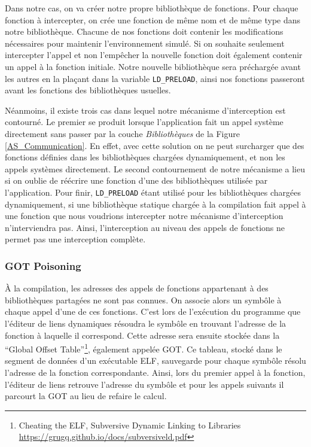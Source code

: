 Dans notre cas, on va créer notre propre bibliothèque de fonctions. Pour chaque
fonction à intercepter, on crée une fonction de même nom et de même type dans
notre bibliothèque. Chacune de nos fonctions doit contenir les modifications
nécessaires pour maintenir l'environnement simulé. Si on souhaite seulement
intercepter l'appel et non l'empêcher la nouvelle fonction doit également
contenir un appel à la fonction initiale. Notre nouvelle bibliothèque sera
préchargée avant les autres en la plaçant dans la variable \texttt{LD\_PRELOAD},
ainsi nos fonctions passeront avant les fonctions des bibliothèques usuelles.

Néanmoins, il existe trois cas dans lequel notre mécanisme d'interception est
contourné. Le premier se produit lorsque l'application fait un appel système
directement sans passer par la couche \textit{Bibliothèques} de la Figure
\ref{AS_Communication}. En effet, avec cette solution on ne peut surcharger que
des fonctions définies dans les bibliothèques chargées dynamiquement, et non les
appels systèmes directement. Le second contournement de notre mécanisme a lieu
si on oublie de réécrire une fonction d'une des bibliothèques utilisée par
l'application. Pour finir, \texttt{LD\_PRELOAD} étant utilisé pour les
bibliothèques chargées dynamiquement, si une bibliothèque statique chargée à la
compilation fait appel à une fonction que nous voudrions intercepter notre
mécanisme d'interception n'interviendra pas. Ainsi, l'interception au niveau des
appels de fonctions ne permet pas une interception complète.

\subsubsection{GOT Poisoning}

À la compilation, les adresses des appels de fonctions appartenant à des bibliothèques partagées ne sont pas connues. On associe alors un symbôle à chaque appel d'une de ces fonctions. C'est lors de l'exécution du programme que l'éditeur de liens dynamiques résoudra le symbôle en trouvant l'adresse de la fonction à laquelle il correspond. Cette adresse sera ensuite stockée dans la ``Global Offset Table''\footnote{Cheating the ELF, Subversive Dynamic Linking to Libraries \\ \url{https://grugq.github.io/docs/subversiveld.pdf}}, également appelée GOT. Ce tableau, stocké dans le segment de données d'un exécutable ELF, sauvegarde pour chaque symbôle résolu l'adresse de la fonction correspondante. Ainsi, lors du premier appel à la fonction, l'éditeur de liens retrouve l'adresse du symbôle et pour les appels suivants il parcourt la GOT au lieu de refaire le calcul.

